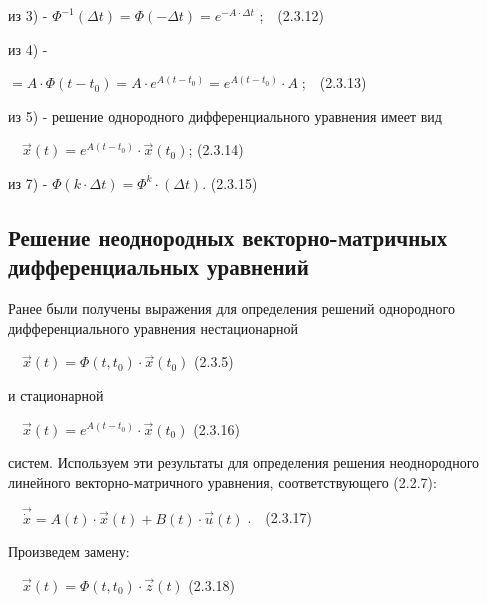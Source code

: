 		из 3) -  $\Phi ^{-1}(\mathit{\Delta t})=\Phi (-\mathit{\Delta t})=e^{-A\cdot \mathit{\Delta t}}$ ;\ \ (2.3.12)



		из 4) - 



		$=A\cdot \Phi (t-t_0)=A\cdot e^{A(t-t_0)}=e^{A(t-t_0)}\cdot A\;$;\ \ (2.3.13)



		из 5) - решение однородного дифференциального уравнения имеет вид



		\ \  $\vec x(t)=e^{A(t-t_0)}\cdot \vec x(t_0)$;  (2.3.14)



		из 7) -  $\Phi (k\cdot \mathit{\Delta t})=\Phi ^k\cdot (\mathit{\Delta t})$.  (2.3.15)



\bigskip


\bigskip

\subsection{Решение неоднородных векторно-матричных дифференциальных уравнений}

		Ранее были получены выражения для определения решений однородного дифференциального уравнения нестационарной



		\ \  $\vec x(t)=\Phi (t,t_0)\cdot \vec x(t_0)$  (2.3.5)



		и стационарной 



		\ \  $\vec x(t)=e^{A(t-t_0)}\cdot \vec x(t_0)$  (2.3.16)



		систем. Используем эти результаты для определения решения неоднородного линейного векторно-матричного уравнения,
		соответствующего (2.2.7):



		\ \  $\vec{\dot x}=A(t)\cdot \vec x(t)+B(t)\cdot \vec u(t)\;$.\ \ (2.3.17)



		Произведем замену:



		\ \  $\vec x(t)=\Phi (t,t_0)\cdot \vec z(t)$  (2.3.18)



